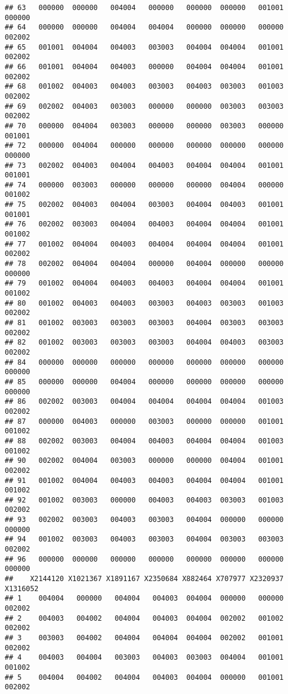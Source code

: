 \documentclass[
]{article}
\begin{document}
\begin{verbatim}
## 63   000000  000000   004004   000000   000000  000000   001001   000000
## 64   000000  000000   004004   004004   000000  000000   000000   002002
## 65   001001  004004   004003   003003   004004  004004   001001   002002
## 66   001001  004004   004003   000000   004004  004004   001001   002002
## 68   001002  004003   004003   003003   004003  003003   001003   002002
## 69   002002  004003   003003   000000   000000  003003   003003   002002
## 70   000000  004004   003003   000000   000000  003003   000000   001001
## 72   000000  004004   000000   000000   000000  000000   000000   000000
## 73   002002  004003   004004   004003   004004  004004   001001   001001
## 74   000000  003003   000000   000000   000000  004004   000000   001002
## 75   002002  004003   004004   003003   004004  004003   001001   001001
## 76   002002  003003   004004   004003   004004  004004   001001   001002
## 77   001002  004004   004003   004004   004004  004004   001001   002002
## 78   002002  004004   004004   000000   004004  000000   000000   000000
## 79   001002  004004   004003   004003   004004  004004   001001   001002
## 80   001002  004003   004003   003003   004003  003003   001003   002002
## 81   001002  003003   003003   003003   004004  003003   003003   002002
## 82   001002  003003   003003   003003   004004  004003   003003   002002
## 84   000000  000000   000000   000000   000000  000000   000000   000000
## 85   000000  000000   004004   000000   000000  000000   000000   000000
## 86   002002  003003   004004   004004   004004  004004   001003   002002
## 87   000000  004003   000000   003003   000000  000000   001001   001002
## 88   002002  003003   004004   004003   004004  004004   001003   001002
## 90   002002  004004   003003   000000   000000  004004   001001   002002
## 91   001002  004004   004003   004003   004004  004004   001001   001002
## 92   001002  003003   000000   004003   004003  003003   001003   002002
## 93   002002  003003   004003   003003   004004  000000   000000   000000
## 94   001002  003003   004003   003003   004004  003003   003003   002002
## 96   000000  000000   000000   000000   000000  000000   000000   000000
##    X2144120 X1021367 X1891167 X2350684 X882464 X707977 X2320937 X1316052
## 1    004004   000000   004004   004003  004004  000000   000000   002002
## 2    004003   004002   004004   004003  004004  002002   001002   002002
## 3    003003   004002   004004   004004  004004  002002   001001   002002
## 4    004003   004004   003003   004003  003003  004004   001001   001002
## 5    004004   004002   004004   004003  004004  000000   001001   002002

\end{verbatim}
\end{document}
